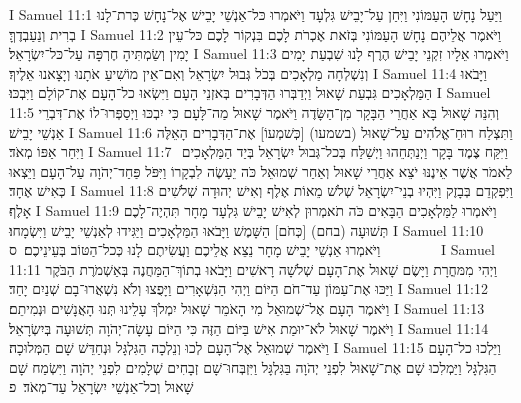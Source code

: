 I Samuel 11:1	וַיַּעַל נָחָשׁ הָעַמּוֹנִי וַיִּחַן עַל־יָבֵישׁ גִּלְעָד וַיֹּאמְרוּ כּל־אַנְשֵׁי יָבֵישׁ אֶל־נָחָשׁ כְּרת־לָנוּ בְרִית וְנַעַבְדֶךָּ׃
I Samuel 11:2	וַיֹּאמֶר אֲלֵיהֶם נָחָשׁ הָעַמּוֹנִי בְּזֹאת אֶכְרֹת לָכֶם בִּנְקוֹר לָכֶם כּל־עֵין יָמִין וְשַׂמְתִּיהָ חֶרְפָּה עַל־כּל־יִשְׂרָאֵל׃
I Samuel 11:3	וַיֹּאמְרוּ אֵלָיו זִקְנֵי יָבֵישׁ הֶרֶף לָנוּ שִׁבְעַת יָמִים וְנִשְׁלְחָה מַלְאָכִים בְּכֹל גְּבוּל יִשְׂרָאֵל וְאִם־אֵין מוֹשִׁיעַ אֹתָנוּ וְיָצָאנוּ אֵלֶיךָ׃
I Samuel 11:4	וַיָּבֹאוּ הַמַּלְאָכִים גִּבְעַת שָׁאוּל וַיְדַבְּרוּ הַדְּבָרִים בְּאזְנֵי הָעָם וַיִּשְׂאוּ כל־הָעָם אֶת־קוֹלָם וַיִּבְכּוּ׃
I Samuel 11:5	וְהִנֵּה שָׁאוּל בָּא אַחֲרֵי הַבָּקָר מִן־הַשָּׂדֶה וַיֹּאמֶר שָׁאוּל מַה־לָּעָם כִּי יִבְכּוּ וַיְסַפְּרוּ־לוֹ אֶת־דִּבְרֵי אַנְשֵׁי יָבֵישׁ׃
I Samuel 11:6	וַתִּצְלַח רוּחַ־אֱלֹהִים עַל־שָׁאוּל (בשמעו) [כְּשׁמְעוֹ] אֶת־הַדְּבָרִים הָאֵלֶּה וַיִּחַר אַפּוֹ מְאֹד׃
I Samuel 11:7	וַיִּקַּח צֶמֶד בָּקָר וַיְנַתְּחֵהוּ וַיְשַׁלַּח בְּכל־גְּבוּל יִשְׂרָאֵל בְּיַד הַמַּלְאָכִים  לֵאמֹר אֲשֶׁר אֵינֶנּוּ יֹצֵא אַחֲרֵי שָׁאוּל וְאַחַר שְׁמוּאֵל כֹּה יֵעָשֶׂה לִבְקָרוֹ וַיִּפֹּל פַּחַד־יְהֹוָה עַל־הָעָם וַיֵּצְאוּ כְּאִישׁ אֶחָד׃
I Samuel 11:8	וַיִּפְקְדֵם בְּבָזֶק וַיִּהְיוּ בְנֵי־יִשְׂרָאֵל שְׁלֹשׁ מֵאוֹת אֶלֶף וְאִישׁ יְהוּדָה שְׁלֹשִׁים אָלֶף׃
I Samuel 11:9	וַיֹּאמְרוּ לַמַּלְאָכִים הַבָּאִים כֹּה תֹאמְרוּן לְאִישׁ יָבֵישׁ גִּלְעָד מָחָר תִּהְיֶה־לָכֶם תְּשׁוּעָה (בחם) [כְּחֹם] הַשָּׁמֶשׁ וַיָּבֹאוּ הַמַּלְאָכִים וַיַּגִּידוּ לְאַנְשֵׁי יָבֵישׁ וַיִּשְׂמָחוּ׃
I Samuel 11:10	וַיֹּאמְרוּ אַנְשֵׁי יָבֵישׁ מָחָר נֵצֵא אֲלֵיכֶם וַעֲשִׂיתֶם לָנוּ כְּכל־הַטּוֹב בְּעֵינֵיכֶם׃ {ס}        
I Samuel 11:11	וַיְהִי מִמּחֳרָת וַיָּשֶׂם שָׁאוּל אֶת־הָעָם שְׁלֹשָׁה רָאשִׁים וַיָּבֹאוּ בְתוֹךְ־הַמַּחֲנֶה בְּאַשְׁמֹרֶת הַבֹּקֶר וַיַּכּוּ אֶת־עַמּוֹן עַד־חֹם הַיּוֹם וַיְהִי הַנִּשְׁאָרִים וַיָּפֻצוּ וְלֹא נִשְׁאֲרוּ־בָם שְׁנַיִם יָחַד׃
I Samuel 11:12	וַיֹּאמֶר הָעָם אֶל־שְׁמוּאֵל מִי הָאֹמֵר שָׁאוּל יִמְלֹךְ עָלֵינוּ תְּנוּ הָאֲנָשִׁים וּנְמִיתֵם׃
I Samuel 11:13	וַיֹּאמֶר שָׁאוּל לֹא־יוּמַת אִישׁ בַּיּוֹם הַזֶּה כִּי הַיּוֹם עָשָׂה־יְהֹוָה תְּשׁוּעָה בְּיִשְׂרָאֵל׃
I Samuel 11:14	וַיֹּאמֶר שְׁמוּאֵל אֶל־הָעָם לְכוּ וְנֵלְכָה הַגִּלְגָּל וּנְחַדֵּשׁ שָׁם הַמְּלוּכָה׃
I Samuel 11:15	וַיֵּלְכוּ כל־הָעָם הַגִּלְגָּל וַיַּמְלִכוּ שָׁם אֶת־שָׁאוּל לִפְנֵי יְהֹוָה בַּגִּלְגָּל וַיִּזְבְּחוּ־שָׁם זְבָחִים שְׁלָמִים לִפְנֵי יְהֹוָה וַיִּשְׂמַח שָׁם שָׁאוּל וְכל־אַנְשֵׁי יִשְׂרָאֵל עַד־מְאֹד׃ {פ}
